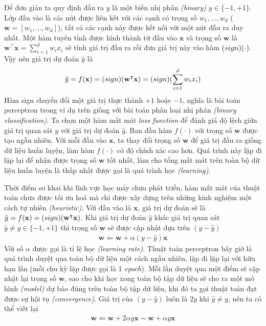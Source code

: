 Để đơn giản ta quy định đầu ra $y$ là một biến nhị phân \textit{(binary)} $y\in\{-1,+1\}$. Lớp đầu vào là các nút được liên kết với các cạnh có trọng số $w_1,\dots,w_d$ ($\mathbf{w}=[w_1,\dots,w_d]$), tất cả các cạnh này được kết nối với một nút đầu ra duy nhất. Một hàm tuyến tính được hình thành từ đầu vào $\mathbf{x}$ và trọng số $\mathbf{w}$ là $\mathbf{w^\intercal x}=\sum^d_{i=1}w_ix_i$ sẽ tính giá trị đầu ra rồi đưa giá trị này vào hàm $\text(sign)(\cdot)$. Vậy nên giá trị dự đoán $\hat{y}$ là
\begin{align}
    \hat{y}=f(\mathbf{x})=\text(sign)(\mathbf{w^\intercal x})=\text(sign)(\sum^d_{i=1}w_ix_i)
\end{align}
Hàm sign chuyển đổi một giá trị thực thành $+1$ hoặc $-1$, nghĩa là bài toán perceptron trong ví dụ trên giống với bài toán phân loại nhị phân \textit{(binary classification)}. Ta chọn một hàm mất mát \textit{loss function} để đánh giá độ lệch giữa giá trị quan sát $y$ với giá trị dự đoán $\hat{y}$. Ban đầu hàm $f(\cdot)$ với trọng số $\mathbf{w}$ được tạo ngẫu nhiên. Với mỗi đầu vào $\mathbf{x}$, ta thay đổi trọng số $\mathbf{w}$ để giá trị đầu ra giống dữ liệu huấn luyện, làm hàm $f(\cdot)$ có độ chính xác cao hơn. Quá trình này lặp đi lặp lại để nhận được trọng số $\mathbf{w}$ tốt nhất, làm cho tổng mất mát trên toàn bộ dữ liệu huấn luyện là thấp nhất được gọi là quá trình học \textit{(learning)}.

Thời điểm sơ khai khi lĩnh vực học máy chưa phát triển, hàm mất mát của thuật toán chưa được tối ưu hoá mà chỉ được xây dựng trên những kinh nghiệm một cách tự nhiên \textit{(heuristic)}. Với đầu vào là $\mathbf{x}$, giá trị dự đoán sẽ là $\hat{y}=f(\mathbf{x})=\text(sign)(\mathbf{w^\intercal x})$. Khi giá trị dự đoán $\hat{y}$ khác giá trị quan sát $\hat{y}\neq y\in\{-1,+1\}$ thì trọng số $\mathbf{w}$ sẽ được cập nhật dựa trên $(y-\hat{y})$
\begin{align}
    \mathbf{w}\Leftarrow\mathbf{w}+\alpha(y-\hat{y})\mathbf{x}
\end{align}
Với số $\alpha$ được gọi là tỉ lệ học \textit{(learning rate)}. Thuật toán perceptron bây giờ là quá trình duyệt qua toàn bộ dữ liệu một cách ngẫu nhiên, lặp đi lặp lại với hữu hạn lần (mỗi chu kỳ lặp được gọi là 1 \textit{epoch}). Mỗi lần duyệt qua một điểm sẽ cập nhật lại trọng số $\mathbf{w}$, sao cho khi học xong toàn bộ tập dữ liệu sẽ cho ra một mô hình \textit{(model)} dự báo đúng trên toàn bộ tập dữ liệu, khi đó ta gọi thuật toán đạt được sự hội tụ \textit{(convergence)}. Giá trị của $(y-\hat{y})$ luôn là $2y$ khi $\hat{y}\neq y$, nên ta có thể viết lại
\begin{align}
    \mathbf{w}\Leftarrow\mathbf{w}+2\alpha y\mathbf{x}\sim\mathbf{w}+\alpha y\mathbf{x}
\end{align}

